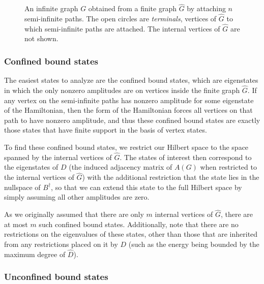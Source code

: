 \documentclass[../thesis-main/thesis-main]{subfiles}
\begin{document}
\begin{figure}
  \centering
  
  \caption{An infinite graph $G$ obtained from a finite graph $\widehat{G}$ by attaching $n$ semi-infinite paths. The open circles are \emph{terminals}, vertices of $\widehat{G}$ to which semi-infinite paths are attached. The internal vertices of $\widehat{G}$ are not shown.}
  \label{fig:basic_graph}
\end{figure}


\subsubsection{Confined bound states}

The easiest states to analyze are the confined bound states, which are eigenstates in which the only nonzero amplitudes are on vertices inside the finite graph $\widehat{G}$. If any vertex on the semi-infinite paths has nonzero amplitude for some eigenstate of the Hamiltonian, then the form of the Hamiltonian forces all vertices on that path to have nonzero amplitude, and thus these confined bound states are exactly those states that have finite support in the basis of vertex states.  

To find these confined bound states, we restrict our Hilbert space to the space spanned by the internal vertices of $\widehat{G}$. The states of interest then correspond to the eigenstates of $D$ (the induced adjacency matrix of $A(G)$ when restricted to the internal vertices of $\widehat{G}$) with the additional restriction that the state lies in the nullspace of $B^\dag$, so that we can extend this state to the full Hilbert space by simply assuming all other amplitudes are zero.    

As we originally assumed that there are only $m$ internal vertices of $\widehat{G}$, there are at most $m$ such confined bound states.  Additionally, note that there are no restrictions on the eigenvalues of these states, other than those that are inherited from any restrictions placed on it by $D$ (such as the energy being bounded by the maximum degree of $\widehat{D}$).

\subsubsection{Unconfined bound states}
\end{document}
